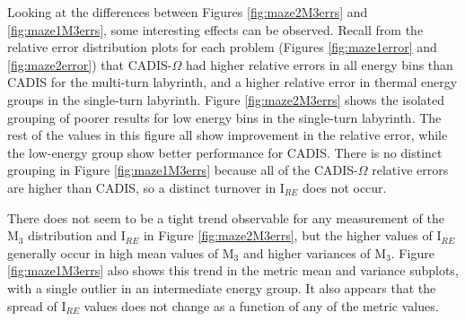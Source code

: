Looking at the differences between Figures \ref{fig:maze2M3errs} and
\ref{fig:maze1M3errs}, some interesting effects can be observed. Recall from the
relative error distribution plots for each problem (Figures \ref{fig:maze1error} and
\ref{fig:maze2error}) that CADIS-$\Omega$ had higher relative errors in all
energy bins than CADIS for the multi-turn labyrinth, and a higher relative
error in thermal energy groups in the single-turn labyrinth.
Figure
\ref{fig:maze2M3errs} shows the isolated grouping of poorer results for low
energy bins in the single-turn labyrinth. The rest of the values in this figure
all show improvement in the relative error, while the low-energy group show
better performance for CADIS. There is no distinct grouping in Figure
\ref{fig:maze1M3errs} because all of the CADIS-$\Omega$ relative errors are
higher than CADIS, so a distinct turnover in I$_{RE}$ does not occur.

There does not seem to be a tight
trend
observable for any measurement of the M$_3$ distribution and I$_{RE}$ in Figure
\ref{fig:maze2M3errs}, but the higher values of I$_{RE}$ generally occur in high
mean values of M$_3$ and higher variances of M$_3$. Figure \ref{fig:maze1M3errs}
also shows this trend in the metric mean and variance subplots, with a single
outlier in an intermediate energy group. It also appears that the spread of
I$_{RE}$ values does not change as a function of any of the metric values.

